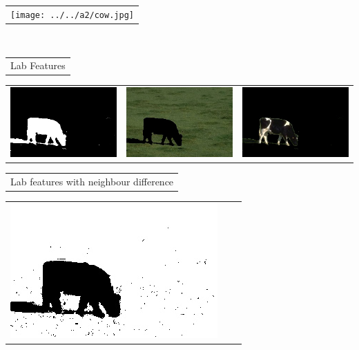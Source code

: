 \documentclass{article}
\begin{document}
\begin{center}
\begin{tabular}{c}
\texttt{[image: ../../a2/cow.jpg]}
\end{tabular}
\\
\begin{tabular}{c}

Lab Features \\
\end{tabular}
 \begin{tabular}{c c c} 

 \includegraphics[width=.4\linewidth]{../image-segmentation/output/Lab/cow_mask.jpg} & 
 
 \includegraphics[width=.4\linewidth]{../image-segmentation/output/Lab/cow_seg1.jpg} & \includegraphics[width=.4\linewidth]{../image-segmentation/output/Lab/cow_seg2.jpg} \\
  
 \end{tabular}
 \begin{tabular}{c}

Lab features with neighbour difference \\
\end{tabular}
 \begin{tabular}{c c c} 

 \includegraphics[width=.4\linewidth]{../image-segmentation/output/add-Lab-neighbor-diff-feature/cow_mask.jpg} & 
 

\end{tabular}
\end{center}
\end{document}
